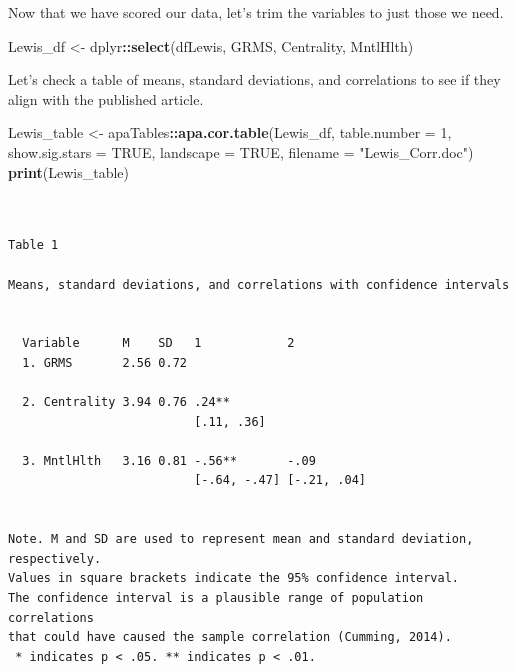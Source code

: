 \documentclass[
  11pt,
]{book}
\newenvironment{Shaded}{\begin{snugshade}}{\end{snugshade}}
\newcommand{\AttributeTok}[1]{\textcolor[rgb]{0.27,0.27,0.27}{#1}}
\newcommand{\ConstantTok}[1]{\textcolor[rgb]{0.37,0.37,0.37}{#1}}
\newcommand{\DecValTok}[1]{\textcolor[rgb]{0.06,0.06,0.06}{#1}}
\newcommand{\FunctionTok}[1]{\textcolor[rgb]{0.27,0.27,0.27}{\textbf{#1}}}
\newcommand{\NormalTok}[1]{#1}
\newcommand{\OtherTok}[1]{\textcolor[rgb]{0.37,0.37,0.37}{#1}}
\newcommand{\SpecialCharTok}[1]{\textcolor[rgb]{0.43,0.43,0.43}{\textbf{#1}}}
\newcommand{\StringTok}[1]{\textcolor[rgb]{0.5,0.5,0.5}{#1}}
\begin{document}
Now that we have scored our data, let's trim the variables to just those we need.

\begin{Shaded}
\begin{Highlighting}[]
\NormalTok{Lewis\_df }\OtherTok{\textless{}{-}}\NormalTok{ dplyr}\SpecialCharTok{::}\FunctionTok{select}\NormalTok{(dfLewis, GRMS, Centrality, MntlHlth)}
\end{Highlighting}
\end{Shaded}

Let's check a table of means, standard deviations, and correlations to see if they align with the published article.

\begin{Shaded}
\begin{Highlighting}[]
\NormalTok{Lewis\_table }\OtherTok{\textless{}{-}}\NormalTok{ apaTables}\SpecialCharTok{::}\FunctionTok{apa.cor.table}\NormalTok{(Lewis\_df, }\AttributeTok{table.number =} \DecValTok{1}\NormalTok{, }\AttributeTok{show.sig.stars =} \ConstantTok{TRUE}\NormalTok{,}
    \AttributeTok{landscape =} \ConstantTok{TRUE}\NormalTok{, }\AttributeTok{filename =} \StringTok{"Lewis\_Corr.doc"}\NormalTok{)}
\FunctionTok{print}\NormalTok{(Lewis\_table)}
\end{Highlighting}
\end{Shaded}

\begin{verbatim}


Table 1 

Means, standard deviations, and correlations with confidence intervals
 

  Variable      M    SD   1            2          
  1. GRMS       2.56 0.72                         
                                                  
  2. Centrality 3.94 0.76 .24**                   
                          [.11, .36]              
                                                  
  3. MntlHlth   3.16 0.81 -.56**       -.09       
                          [-.64, -.47] [-.21, .04]
                                                  

Note. M and SD are used to represent mean and standard deviation, respectively.
Values in square brackets indicate the 95% confidence interval.
The confidence interval is a plausible range of population correlations 
that could have caused the sample correlation (Cumming, 2014).
 * indicates p < .05. ** indicates p < .01.
 
\end{verbatim}
\end{document}
